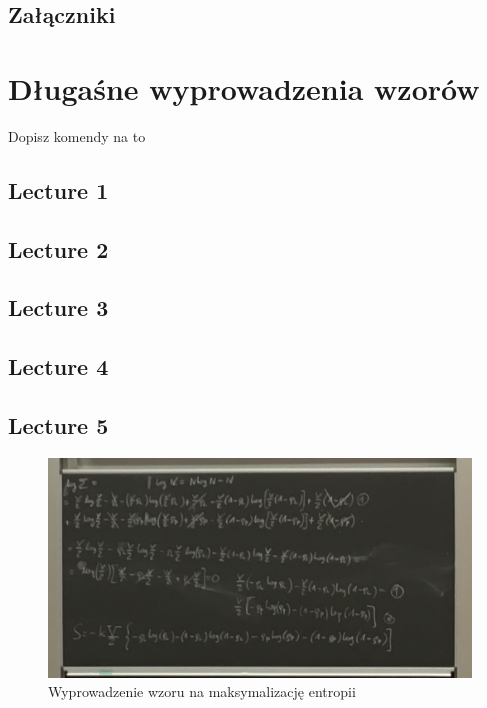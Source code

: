 \documentclass[12pt,a4paper]{report}
\newcommand{\com}[1]{{\color{red} #1}}
\begin{document}
\tableofcontents

\listoffigures

\printindex

\begin{center}
    \chapter*{Załączniki}
\end{center}

\appendix
\setcounter{table}{0}
\captionsetup[table]{name=Załącznik}
\captionsetup[figure]{name=Załącznik}
\captionsetup[section]{name=Lecture}

\chapter{Długaśne wyprowadzenia wzorów}

\com{Dopisz komendy na to}

\section{Lecture 1}

\section{Lecture 2}

\section{Lecture 3}

\section{Lecture 4}

\section{Lecture 5}

\begin{figure}[!ht]
    \centering
    \includegraphics[width=\linewidth]{Wyk_5_Rys_2.JPG}
    \caption{Wyprowadzenie wzoru na maksymalizację entropii}
    \label{fig:lec_5:app:maksymalizacja_entropii}
\end{figure}
\end{document}
